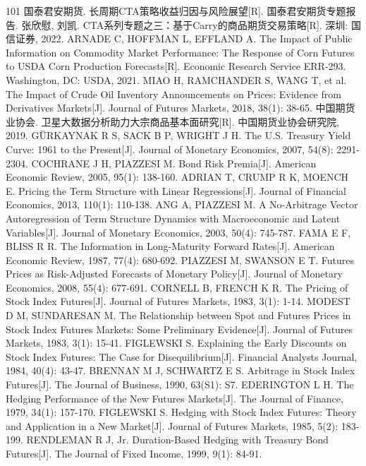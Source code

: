 \documentclass[12pt,a4paper]{ctexart}
\begin{document}
\begin{thebibliography}{101}
 国泰君安期货. 长周期CTA策略收益归因与风险展望[R]. 国泰君安期货专题报告.
 张欣慰, 刘凯. CTA系列专题之三：基于Carry的商品期货交易策略[R]. 深圳: 国信证券, 2022.
 ARNADE C, HOFFMAN L, EFFLAND A. The Impact of Public Information on Commodity Market Performance: The Response of Corn Futures to USDA Corn Production Forecasts[R]. Economic Research Service ERR-293. Washington, DC: USDA, 2021.
 MIAO H, RAMCHANDER S, WANG T, et al. The Impact of Crude Oil Inventory Announcements on Prices: Evidence from Derivatives Markets[J]. Journal of Futures Markets, 2018, 38(1): 38-65.
 中国期货业协会. 卫星大数据分析助力大宗商品基本面研究[R]. 中国期货业协会研究院, 2019.
 GÜRKAYNAK R S, SACK B P, WRIGHT J H. The U.S. Treasury Yield Curve: 1961 to the Present[J]. Journal of Monetary Economics, 2007, 54(8): 2291-2304.
 COCHRANE J H, PIAZZESI M. Bond Risk Premia[J]. American Economic Review, 2005, 95(1): 138-160.
 ADRIAN T, CRUMP R K, MOENCH E. Pricing the Term Structure with Linear Regressions[J]. Journal of Financial Economics, 2013, 110(1): 110-138.
 ANG A, PIAZZESI M. A No-Arbitrage Vector Autoregression of Term Structure Dynamics with Macroeconomic and Latent Variables[J]. Journal of Monetary Economics, 2003, 50(4): 745-787.
 FAMA E F, BLISS R R. The Information in Long-Maturity Forward Rates[J]. American Economic Review, 1987, 77(4): 680-692.
 PIAZZESI M, SWANSON E T. Futures Prices as Risk-Adjusted Forecasts of Monetary Policy[J]. Journal of Monetary Economics, 2008, 55(4): 677-691.
 CORNELL B, FRENCH K R. The Pricing of Stock Index Futures[J]. Journal of Futures Markets, 1983, 3(1): 1-14.
 MODEST D M, SUNDARESAN M. The Relationship between Spot and Futures Prices in Stock Index Futures Markets: Some Preliminary Evidence[J]. Journal of Futures Markets, 1983, 3(1): 15-41.
 FIGLEWSKI S. Explaining the Early Discounts on Stock Index Futures: The Case for Disequilibrium[J]. Financial Analysts Journal, 1984, 40(4): 43-47.
 BRENNAN M J, SCHWARTZ E S. Arbitrage in Stock Index Futures[J]. The Journal of Business, 1990, 63(S1): S7.
 EDERINGTON L H. The Hedging Performance of the New Futures Markets[J]. The Journal of Finance, 1979, 34(1): 157-170.
 FIGLEWSKI S. Hedging with Stock Index Futures: Theory and Application in a New Market[J]. Journal of Futures Markets, 1985, 5(2): 183-199.
 RENDLEMAN R J, Jr. Duration-Based Hedging with Treasury Bond Futures[J]. The Journal of Fixed Income, 1999, 9(1): 84-91.

\end{thebibliography}
\end{document}
